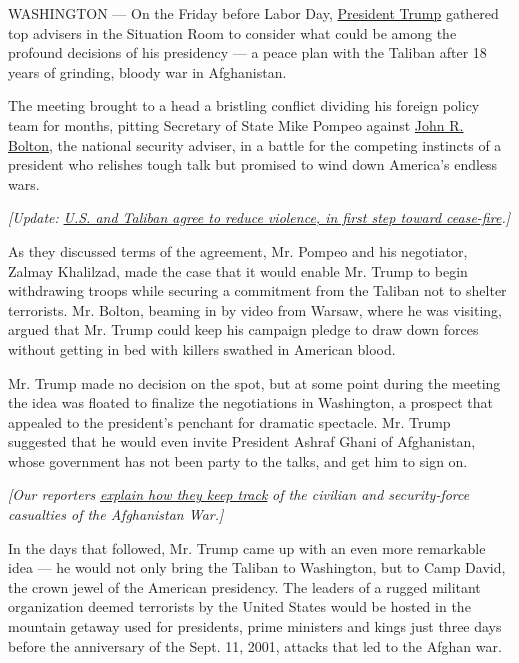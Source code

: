 WASHINGTON --- On the Friday before Labor Day,
\href{https://www.nytimes.com/2019/09/10/us/politics/john-bolton-national-security-adviser-trump.html}{President
Trump} gathered top advisers in the Situation Room to consider what
could be among the profound decisions of his presidency --- a peace plan
with the Taliban after 18 years of grinding, bloody war in Afghanistan.

The meeting brought to a head a bristling conflict dividing his foreign
policy team for months, pitting Secretary of State Mike Pompeo against
\href{https://www.nytimes.com/2019/09/10/us/politics/john-bolton-national-security-adviser-trump.html}{John
R. Bolton}, the national security adviser, in a battle for the competing
instincts of a president who relishes tough talk but promised to wind
down America's endless wars.

\emph{{[}Update:}
\emph{\href{https://www.nytimes.com/2020/02/14/world/asia/taliban-cease-fire-step-afghanistan.html}{U.S.
and Taliban agree to reduce violence, in first step toward
cease-fire}.{]}}

As they discussed terms of the agreement, Mr. Pompeo and his negotiator,
Zalmay Khalilzad, made the case that it would enable Mr. Trump to begin
withdrawing troops while securing a commitment from the Taliban not to
shelter terrorists. Mr. Bolton, beaming in by video from Warsaw, where
he was visiting, argued that Mr. Trump could keep his campaign pledge to
draw down forces without getting in bed with killers swathed in American
blood.

Mr. Trump made no decision on the spot, but at some point during the
meeting the idea was floated to finalize the negotiations in Washington,
a prospect that appealed to the president's penchant for dramatic
spectacle. Mr. Trump suggested that he would even invite President
Ashraf Ghani of Afghanistan, whose government has not been party to the
talks, and get him to sign on.

\emph{{[}Our reporters}
\href{https://www.nytimes.com/2019/09/10/reader-center/afghanistan-casualty-report.html}{\emph{explain
how they keep track}} \emph{of the civilian and security-force
casualties of the Afghanistan War.{]}}

In the days that followed, Mr. Trump came up with an even more
remarkable idea --- he would not only bring the Taliban to Washington,
but to Camp David, the crown jewel of the American presidency. The
leaders of a rugged militant organization deemed terrorists by the
United States would be hosted in the mountain getaway used for
presidents, prime ministers and kings just three days before the
anniversary of the Sept. 11, 2001, attacks that led to the Afghan war.


